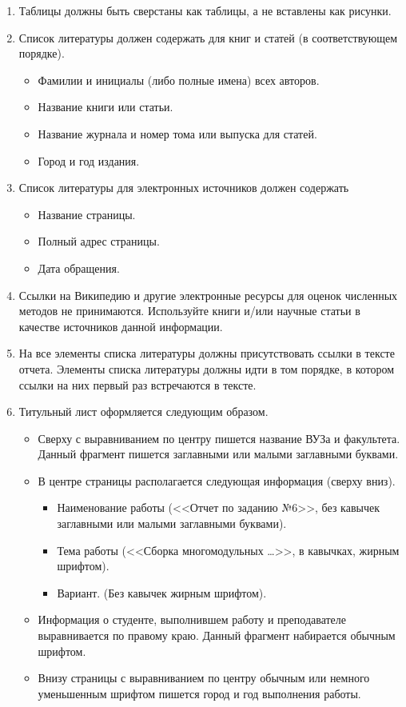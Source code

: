 \documentclass[a4paper,12pt,titlepage,finall]{article}
\begin{document}
\begin{enumerate}
    на рисунке, явно заметно размазывание элементов букв, то такое изображение считается
    слишком низкого качества, и оно не должно быть использовано в отчете.
\item Таблицы должны быть сверстаны как таблицы, а не вставлены как рисунки.
\item Список литературы должен содержать для книг и статей (в соответствующем порядке).
    \begin{itemize}
    \item Фамилии и инициалы (либо полные имена) всех авторов.
    \item Название книги или статьи.
    \item Название журнала и номер тома или выпуска для статей.
    \item Город и год издания.
    \end{itemize}
\item Список литературы для электронных источников должен содержать
    \begin{itemize}
    \item Название страницы.
    \item Полный адрес страницы.
    \item Дата обращения.
    \end{itemize}
\item Ссылки на Википедию и другие электронные ресурсы для оценок численных 
    методов не принимаются. Используйте книги и/или научные статьи в качестве 
    источников данной информации.
\item На все элементы списка литературы должны присутствовать ссылки в тексте отчета. Элементы
    списка литературы должны идти в том порядке, в котором ссылки на них первый
    раз встречаются в тексте.
\item Титульный лист оформляется следующим образом.
    \begin{itemize}
    \item Сверху с выравниванием по центру пишется название ВУЗа и факультета. Данный
        фрагмент пишется заглавными или малыми заглавными буквами.
    \item В центре страницы располагается следующая информация (сверху вниз).
        \begin{itemize}
        \item Наименование работы (<<Отчет по заданию №6>>, без кавычек заглавными
            или малыми заглавными буквами).
        \item Тема работы (<<Сборка многомодульных \dots>>, в кавычках, жирным шрифтом).
        \item Вариант. (Без кавычек жирным шрифтом).
        \end{itemize}
    \item Информация о студенте, выполнившем работу и преподавателе выравнивается
        по правому краю. Данный фрагмент набирается обычным шрифтом.
    \item Внизу страницы с выравниванием по центру обычным или немного уменьшенным
        шрифтом пишется город и год выполнения работы.
    \end{itemize}
\end{enumerate}
\end{document}
